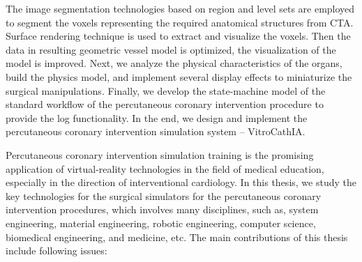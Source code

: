 The image segmentation technologies based on region and level sets are employed 
to segment the voxels representing the required anatomical structures from CTA. 
Surface rendering technique is used to extract and visualize the voxels. Then 
the data in resulting geometric vessel model is optimized, the visualization of 
the model is improved. Next, we analyze the physical characteristics of the 
organs, build the physics model, and implement several display effects to 
miniaturize the surgical manipulations. Finally, we develop the state-machine 
model of the standard workflow of the percutaneous coronary intervention 
procedure to provide the log functionality. In the end, we design and implement 
the percutaneous coronary intervention simulation system -- VitroCathIA.

Percutaneous coronary intervention simulation training is the promising 
application of virtual-reality technologies in the field of medical education, 
especially in the direction of interventional cardiology. In this thesis, we 
study the key technologies for the surgical simulators for the percutaneous 
coronary intervention procedures, which involves many disciplines, such as, 
system engineering, material engineering, robotic engineering, computer 
science, biomedical engineering, and medicine, etc. The main contributions of
this thesis include following issues:
